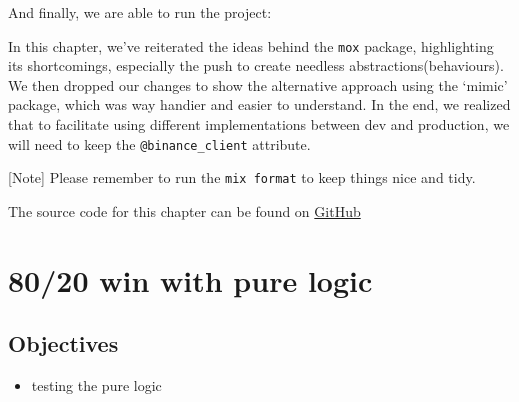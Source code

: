 \documentclass[
  oneside]{book}
\newenvironment{Shaded}{\begin{snugshade}}{\end{snugshade}}
\newcommand{\AttributeTok}[1]{\textcolor[rgb]{0.13,0.29,0.53}{#1}}
\newcommand{\BuiltInTok}[1]{#1}
\newcommand{\ErrorTok}[1]{\textcolor[rgb]{0.64,0.00,0.00}{\textbf{#1}}}
\newcommand{\ExtensionTok}[1]{#1}
\newcommand{\KeywordTok}[1]{\textcolor[rgb]{0.13,0.29,0.53}{\textbf{#1}}}
\newcommand{\NormalTok}[1]{#1}
\newcommand{\OperatorTok}[1]{\textcolor[rgb]{0.81,0.36,0.00}{\textbf{#1}}}
\newcommand{\PreprocessorTok}[1]{\textcolor[rgb]{0.56,0.35,0.01}{\textit{#1}}}
\newcommand{\SpecialStringTok}[1]{\textcolor[rgb]{0.31,0.60,0.02}{#1}}
\newcommand{\StringTok}[1]{\textcolor[rgb]{0.31,0.60,0.02}{#1}}
\providecommand{\tightlist}{%
  \setlength{\itemsep}{0pt}\setlength{\parskip}{0pt}}
\begin{document}
And finally, we are able to run the project:

\begin{Shaded}
\end{Shaded}

In this chapter, we've reiterated the ideas behind the \texttt{mox} package, highlighting its shortcomings, especially the push to create needless abstractions(behaviours). We then dropped our changes to show the alternative approach using the `mimic' package, which was way handier and easier to understand. In the end, we realized that to facilitate using different implementations between dev and production, we will need to keep the \texttt{@binance\_client} attribute.

{[}Note{]} Please remember to run the \texttt{mix\ format} to keep things nice and tidy.

The source code for this chapter can be found on \href{https://github.com/Cinderella-Man/hands-on-elixir-and-otp-cryptocurrency-trading-bot-source-code/tree/chapter_21}{GitHub}

\chapter{80/20 win with pure logic}\label{win-with-pure-logic}

\section{Objectives}\label{objectives-21}

\begin{itemize}
\tightlist
\item
  testing the pure logic
\end{itemize}
\end{document}
